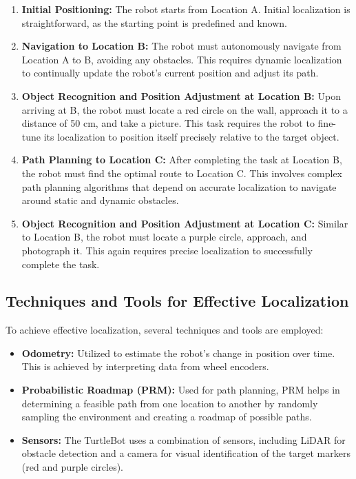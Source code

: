 \documentclass{article}
\begin{document}
	\begin{enumerate}
		\item \textbf{Initial Positioning:} The robot starts from Location A. Initial localization is straightforward, as the starting point is predefined and known.
		\item \textbf{Navigation to Location B:} The robot must autonomously navigate from Location A to B, avoiding any obstacles. This requires dynamic localization to continually update the robot's current position and adjust its path.
		\item \textbf{Object Recognition and Position Adjustment at Location B:} Upon arriving at B, the robot must locate a red circle on the wall, approach it to a distance of 50 cm, and take a picture. This task requires the robot to fine-tune its localization to position itself precisely relative to the target object.
		\item \textbf{Path Planning to Location C:} After completing the task at Location B, the robot must find the optimal route to Location C. This involves complex path planning algorithms that depend on accurate localization to navigate around static and dynamic obstacles.
		\item \textbf{Object Recognition and Position Adjustment at Location C:} Similar to Location B, the robot must locate a purple circle, approach, and photograph it. This again requires precise localization to successfully complete the task.
	\end{enumerate}
	
	\subsection{Techniques and Tools for Effective Localization}
	To achieve effective localization, several techniques and tools are employed:
	\begin{itemize}
		\item \textbf{Odometry:} Utilized to estimate the robot's change in position over time. This is achieved by interpreting data from wheel encoders.
		\item \textbf{Probabilistic Roadmap (PRM):} Used for path planning, PRM helps in determining a feasible path from one location to another by randomly sampling the environment and creating a roadmap of possible paths.
		\item \textbf{Sensors:} The TurtleBot uses a combination of sensors, including LiDAR for obstacle detection and a camera for visual identification of the target markers (red and purple circles).
	\end{itemize}
\end{document}
